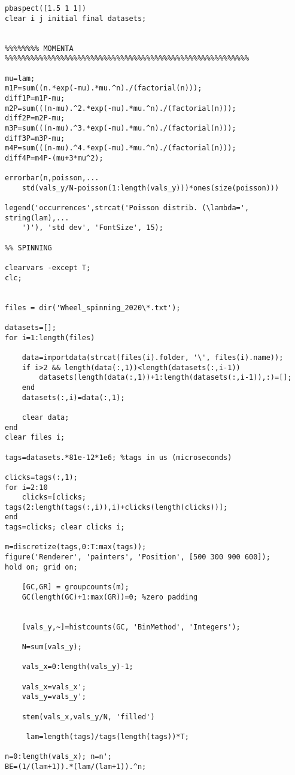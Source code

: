 \begin{lstlisting}[basicstyle=\scriptsize,]
pbaspect([1.5 1 1])
clear i j initial final datasets;


%%%%%%%% MOMENTA %%%%%%%%%%%%%%%%%%%%%%%%%%%%%%%%%%%%%%%%%%%%%%%%%%%%%%%%%

mu=lam;
m1P=sum((n.*exp(-mu).*mu.^n)./(factorial(n)));
diff1P=m1P-mu;
m2P=sum(((n-mu).^2.*exp(-mu).*mu.^n)./(factorial(n)));
diff2P=m2P-mu;
m3P=sum(((n-mu).^3.*exp(-mu).*mu.^n)./(factorial(n)));
diff3P=m3P-mu;
m4P=sum(((n-mu).^4.*exp(-mu).*mu.^n)./(factorial(n)));
diff4P=m4P-(mu+3*mu^2);

errorbar(n,poisson,...
    std(vals_y/N-poisson(1:length(vals_y)))*ones(size(poisson)))

legend('occurrences',strcat('Poisson distrib. (\lambda=', string(lam),...
    ')'), 'std dev', 'FontSize', 15);

%% SPINNING

clearvars -except T;
clc;


files = dir('Wheel_spinning_2020\*.txt');

datasets=[];
for i=1:length(files)
    
    data=importdata(strcat(files(i).folder, '\', files(i).name));
    if i>2 && length(data(:,1))<length(datasets(:,i-1))
        datasets(length(data(:,1))+1:length(datasets(:,i-1)),:)=[];
    end    
    datasets(:,i)=data(:,1);

    clear data;
end
clear files i;

tags=datasets.*81e-12*1e6; %tags in us (microseconds)

clicks=tags(:,1);
for i=2:10
    clicks=[clicks; tags(2:length(tags(:,i)),i)+clicks(length(clicks))];
end
tags=clicks; clear clicks i;

m=discretize(tags,0:T:max(tags));
figure('Renderer', 'painters', 'Position', [500 300 900 600]);
hold on; grid on;

    [GC,GR] = groupcounts(m);
    GC(length(GC)+1:max(GR))=0; %zero padding


    [vals_y,~]=histcounts(GC, 'BinMethod', 'Integers');
    
    N=sum(vals_y);
    
    vals_x=0:length(vals_y)-1; 
    
    vals_x=vals_x';
    vals_y=vals_y';
    
    stem(vals_x,vals_y/N, 'filled')
           
     lam=length(tags)/tags(length(tags))*T;

n=0:length(vals_x); n=n';
BE=(1/(lam+1)).*(lam/(lam+1)).^n;


\end{lstlisting}
